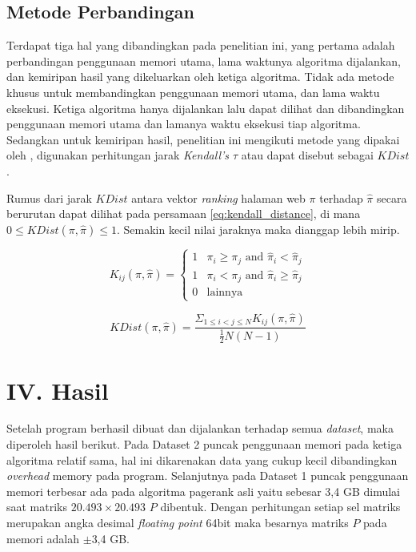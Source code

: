 \documentclass[
	a4paper, %
	12pt, %
	unnumberedsections, %
	twoside, %
]{LTJournalArticle}
\begin{document}
\subsection{Metode Perbandingan}

Terdapat tiga hal yang dibandingkan pada penelitian ini, yang pertama adalah perbandingan penggunaan memori utama, lama waktunya algoritma dijalankan, dan kemiripan hasil yang dikeluarkan oleh ketiga algoritma. Tidak ada metode khusus untuk membandingkan penggunaan memori utama, dan lama waktu eksekusi. Ketiga algoritma hanya dijalankan lalu dapat dilihat dan dibandingkan penggunaan memori utama dan lamanya waktu eksekusi tiap algoritma. Sedangkan untuk kemiripan hasil, penelitian ini mengikuti metode yang dipakai oleh \citet{zhuetal2005distributedPagerank}, digunakan perhitungan jarak \textit{Kendall's $\tau$} atau dapat disebut sebagai $KDist$.

Rumus dari jarak $KDist$ antara vektor \textit{ranking} halaman web $\pi$ terhadap $\hat{\pi}$ secara berurutan dapat dilihat pada persamaan \ref{eq:kendall_distance}, di mana $0 \leq KDist(\pi, \hat{\pi}) \leq 1$. Semakin kecil nilai jaraknya maka dianggap lebih mirip.

\begin{equation}
	K_{ij}(\pi, \hat{\pi}) = 
	\begin{cases}
		1 & \pi_i \geq \pi_j \text{ and } \hat{\pi}_i < \hat{\pi}_j \\
		1 & \pi_i < \pi_j \text{ and } \hat{\pi}_i \geq \hat{\pi}_j \\
		0 & \text{lainnya}
	\end{cases}
\end{equation}

\begin{equation}
	\label{eq:kendall_distance}
	KDist(\pi, \hat{\pi}) = \frac{\Sigma_{1 \leq i < j \leq N} K_{ij}(\pi, \hat{\pi})}{\frac{1}{2} N(N-1)}
\end{equation}


\section{IV. Hasil}

Setelah program berhasil dibuat dan dijalankan terhadap semua \textit{dataset}, maka diperoleh hasil berikut. Pada Dataset 2 puncak penggunaan memori pada ketiga algoritma relatif sama, hal ini dikarenakan data yang cukup kecil dibandingkan \textit{overhead} memory pada program. Selanjutnya pada Dataset 1 puncak penggunaan memori terbesar ada pada algoritma pagerank asli yaitu sebesar 3,4 GB dimulai saat matriks $20.493\times 20.493$ $P$ dibentuk. Dengan perhitungan setiap sel matriks merupakan angka desimal \textit{floating point} 64bit maka besarnya matriks $P$ pada memori adalah $\pm$3,4 GB. 
\end{document}
